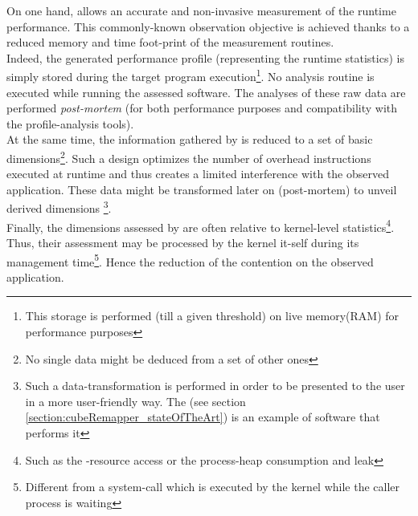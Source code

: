 		On one hand, \toolProfiling\space allows an accurate and non-invasive measurement of the runtime performance.   This commonly-known observation objective is achieved thanks to a reduced memory and time foot-print of the measurement routines.\\
		Indeed, the generated performance profile (representing the runtime statistics) is simply stored during the target program execution\footnote{This storage is performed (till a given threshold) on live memory(RAM) for performance purposes}.   No analysis routine is executed while running the assessed software.   The analyses of these raw data are performed \textit{post-mortem} (for both performance purposes and compatibility with the profile-analysis tools).\\
		At the same time, the information gathered by \toolProfiling\space is reduced to a set of basic dimensions\footnote{No single data might be deduced from a set of other ones}.   Such a design optimizes the number of overhead instructions executed at runtime and thus creates a limited interference with the observed application.   These data might be transformed later on (post-mortem) to unveil derived dimensions \footnote{Such a data-transformation is performed in order to be presented to the user in a more user-friendly way.   The \toolTargetSoftware (see section \ref{section:cubeRemapper_stateOfTheArt}) is an example of software that performs it}.\\
		Finally, the dimensions assessed by \toolProfiling\space are often relative to kernel-level statistics\footnote{Such as the \notationIO-resource access or the process-heap consumption and leak}. Thus, their assessment may be processed by the kernel it-self during its management time\footnote{Different from a system-call which is executed by the kernel while the caller process is waiting}.   Hence the reduction of the contention on the observed application.\\

